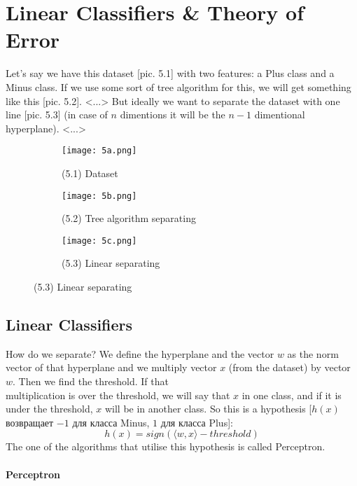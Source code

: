 \chapter{Linear Classifiers \& Theory of Error}

{\sf Let's say we have this dataset [pic. 5.1] with two features: a Plus class and a Minus class. If we use some sort of tree algorithm for this, we will get something like this [pic. 5.2]. <...> But ideally we want to separate the dataset with one line [pic. 5.3] (in case of $n$ dimentions it will be the $n-1$ dimentional hyperplane). <...>\\
\begin{figure}[h!]
  \centering
  \begin{subfigure}[l]{0.3\linewidth}
    \texttt{[image: 5a.png]}
    \caption*{(5.1) Dataset}
  \end{subfigure}
  \begin{subfigure}[r]{0.3\linewidth}
    \texttt{[image: 5b.png]}
    \caption*{(5.2) Tree algorithm separating}
  \end{subfigure}
  \begin{subfigure}[r]{0.3\linewidth}
    \texttt{[image: 5c.png]}
    \caption*{(5.3) Linear separating}
  \end{subfigure}
\end{figure}
}

\section{Linear Classifiers}

How do we separate? We define the hyperplane and the vector $w$ as the norm vector of that hyperplane and we multiply vector $x$ (from the dataset) by vector $w$. Then we find the threshold. If that\\ multiplication is over the threshold, we will say that $x$ in one class, and if it is under the threshold, $x$ will be in another class.
So this is a hypothesis [$h(x)$ возвращает $-1$ для класса Minus, $1$ для класса Plus]:
$$h(x)=sign\left(\langle w,x\rangle-threshold\right)$$
The one of the algorithms that utilise this hypothesis is called Perceptron.

\subsubsection*{Perceptron}

